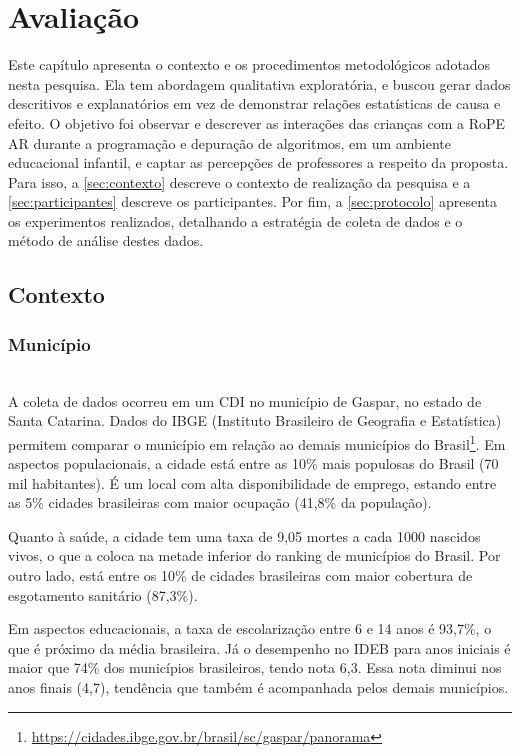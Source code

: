 \chapter{Avaliação}
\label{c_avaliacao}
Este capítulo apresenta o contexto e os procedimentos metodológicos adotados nesta pesquisa. Ela tem abordagem qualitativa exploratória, e buscou gerar dados descritivos e explanatórios em vez de demonstrar relações estatísticas de causa e efeito.
O objetivo foi observar e descrever as interações das crianças com a RoPE AR durante a programação e depuração de algoritmos, em um ambiente educacional infantil, e captar as percepções de professores a respeito da proposta. Para isso, a \autoref{sec:contexto} descreve o contexto de realização da pesquisa e a \autoref{sec:participantes} descreve os participantes. Por fim, a \autoref{sec:protocolo} apresenta os experimentos realizados, detalhando a estratégia de coleta de dados e o método de análise destes dados.

\section{Contexto}
\label{sec:contexto}
\subsection{Município}\\
A coleta de dados ocorreu em um \ac{CDI} no município de Gaspar, no estado de Santa Catarina. Dados do IBGE (Instituto Brasileiro de Geografia e Estatística) permitem comparar o município em relação ao demais municípios do Brasil\footnote{\url{https://cidades.ibge.gov.br/brasil/sc/gaspar/panorama}}. Em aspectos populacionais, a cidade está entre as 10\% mais populosas do Brasil (70 mil habitantes). É um local com alta disponibilidade de emprego, estando entre as 5\% cidades brasileiras com maior ocupação (41,8\% da população). 

Quanto à saúde, a cidade tem uma taxa de 9,05 mortes a cada 1000 nascidos vivos, o que a coloca na metade inferior do ranking de municípios do Brasil. Por outro lado, está entre os 10\% de cidades brasileiras com maior cobertura de esgotamento sanitário (87,3\%).

Em aspectos educacionais, a taxa de escolarização entre 6 e 14 anos é 93,7\%, o que é próximo da média brasileira. Já o desempenho no \ac{IDEB} para anos iniciais é maior que 74\% dos municípios brasileiros, tendo nota 6,3. Essa nota diminui nos anos finais (4,7), tendência que também é acompanhada pelos demais municípios. 

